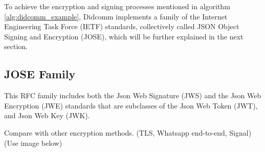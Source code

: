 To achieve the encryption and signing processes mentioned in algorithm \ref{alg:didcomm_example}, Didcomm implements a family of the Internet Engineering Task Force (IETF) standards, collectively called JSON Object Signing and Encryption (JOSE), which will be further explained in the next section. 

\subsection{JOSE Family}

This RFC family includes both the Json Web Signature (JWS) and the Json Web Encryption (JWE) standards that are subclasses of the Json Web Token (JWT), and Json Web Key (JWK).

Compare with other encryption methods. (TLS, Whatsapp end-to-end, Signal) (Use image below)
 